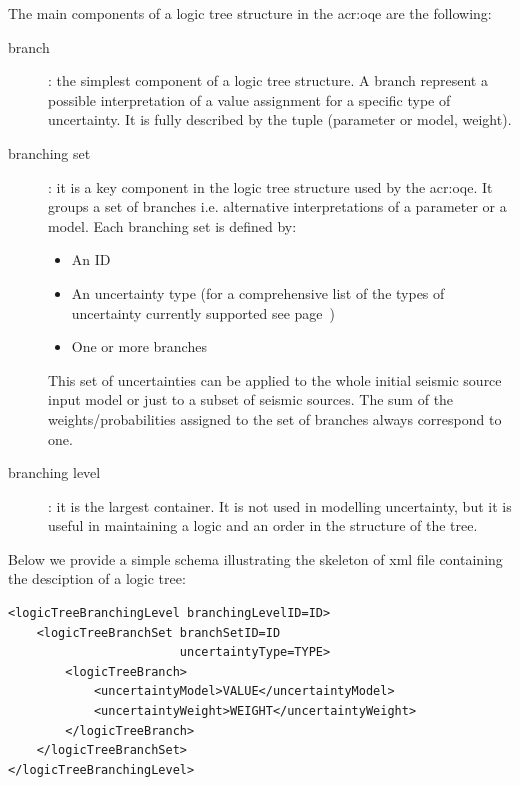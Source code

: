 The main components of a logic tree structure in the \glsdesc{acr:oqe} are the
following:

\begin{description}

    \item[branch]: the simplest component of a logic tree structure. A branch
	represent a possible interpretation of a value assignment for a specific type
	of uncertainty. It is fully described by the tuple (parameter or model,
	weight).

    \item[branching set]: it is a key component in the logic tree structure
	used by the \gls{acr:oqe}. It groups a set of branches i.e. alternative
	interpretations of a parameter or a model. Each branching set is defined by:

    \begin{itemize}

        \item An ID

        \item An uncertainty type (for a comprehensive list of the types of
		uncertainty currently supported see page~\pageref{list_epistemic_unc})

        \item One or more branches

    \end{itemize}

    This set of uncertainties can be applied to the whole initial  seismic
    source input model or just to a subset of seismic sources. The sum of the
    weights/probabilities assigned to the set  of branches always correspond
    to one.

    \item[branching level]: it is the largest container. It is not used in
	modelling uncertainty, but it is useful in maintaining a logic and an
	order in the structure of the tree.

\end{description}

Below we provide a simple schema illustrating the skeleton of xml file
containing the desciption of a logic tree:

\begin{verbatim}
<logicTreeBranchingLevel branchingLevelID=ID>
    <logicTreeBranchSet branchSetID=ID
                        uncertaintyType=TYPE>
        <logicTreeBranch>
            <uncertaintyModel>VALUE</uncertaintyModel>
            <uncertaintyWeight>WEIGHT</uncertaintyWeight>
        </logicTreeBranch>
    </logicTreeBranchSet>
</logicTreeBranchingLevel>
\end{verbatim}

